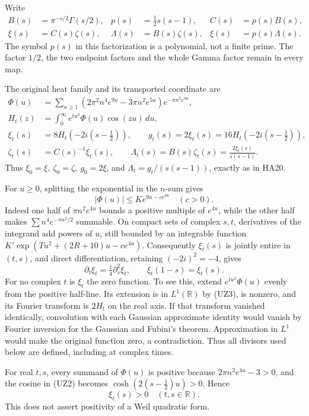 \documentclass[
  10pt,
  a4paper,
]{article}
\begin{document}
Write \[
\begin{aligned}
B(s)&=\pi^{-s/2}\Gamma(s/2),&
p(s)&=\tfrac12s(s-1),&
C(s)&=p(s)B(s),\\
\xi(s)&=C(s)\zeta(s),&
\Lambda(s)&=B(s)\zeta(s),&
\xi(s)&=p(s)\Lambda(s).
\end{aligned}\tag{UZ1}
\] The symbol \(p(s)\) in this factorization is a polynomial, not a
finite prime. The factor \(1/2\), the two endpoint factors and the whole
Gamma factor remain in every map.

The original heat family and its transported coordinate are \[
\begin{aligned}
\Phi(u)&=\sum_{n\ge1}(2\pi^2n^4e^{9u}-3\pi n^2e^{5u})e^{-\pi n^2e^{4u}},\\
H_t(z)&=\int_0^\infty e^{tu^2}\Phi(u)\cos(zu)\,du,\\
\xi_t(s)&=8H_t(-2i(s-\tfrac12)),\qquad
g_t(s)=2\xi_t(s)=16H_t(-2i(s-\tfrac12)),\\
\zeta_t(s)&=C(s)^{-1}\xi_t(s),\qquad
\Lambda_t(s)=B(s)\zeta_t(s)=\frac{2\xi_t(s)}{s(s-1)}.
\end{aligned}\tag{UZ2}
\] Thus \(\xi_0=\xi,\ \zeta_0=\zeta,\ g_0=2\xi\), and
\(\Lambda_t=g_t/(s(s-1))\), exactly as in HA20.

For \(u\ge0\), splitting the exponential in the \(n\)-sum gives \[
|\Phi(u)|\le K e^{9u-ce^{4u}}\quad(c>0).
\tag{UZ3}
\] Indeed one half of \(\pi n^2e^{4u}\) bounds a positive multiple of
\(e^{4u}\), while the other half makes \(\sum n^4e^{-\pi n^2/2}\)
summable. On compact sets of complex \(s,t\), derivatives of the
integrand add powers of \(u\), still bounded by an integrable function
\(K'\exp(Tu^2+(2R+10)u-ce^{4u})\). Consequently \(\xi_t(s)\) is jointly
entire in \((t,s)\), and direct differentiation, retaining
\((-2i)^2=-4\), gives \[
\partial_t\xi_t=\tfrac14\partial_s^2\xi_t,\qquad
\xi_t(1-s)=\xi_t(s).
\tag{UZ4}
\] For no complex \(t\) is \(\xi_t\) the zero function. To see this,
extend \(e^{tu^2}\Phi(u)\) evenly from the positive half-line. Its
extension is in \(L^1(\mathbb R)\) by (UZ3), is nonzero, and its Fourier
transform is \(2H_t\) on the real axis. If that transform vanished
identically, convolution with each Gaussian approximate identity would
vanish by Fourier inversion for the Gaussian and Fubini's theorem.
Approximation in \(L^1\) would make the original function zero, a
contradiction. Thus all divisors used below are defined, including at
complex times.

For real \(t,s\), every summand of \(\Phi(u)\) is positive because
\(2\pi n^2e^{4u}-3>0\), and the cosine in (UZ2) becomes
\(\cosh(2(s-\tfrac12)u)>0\). Hence \[
\xi_t(s)>0\quad(t,s\in\mathbb R).
\tag{UZ5}
\] This does not assert positivity of a Weil quadratic form.
\end{document}
